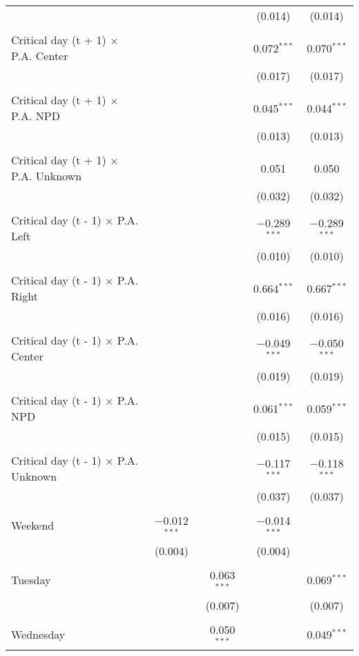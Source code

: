 \documentclass[
]{article}
\begin{document}
\begin{table}[!htbp]
{\begin{tabular}{@{\extracolsep{5pt}}lcccc}
  &  &  & (0.014) & (0.014) \\ 
  & & & & \\ 
 Critical day (t + 1) $\times$ P.A. Center &  &  & 0.072$^{***}$ & 0.070$^{***}$ \\ 
  &  &  & (0.017) & (0.017) \\ 
  & & & & \\ 
 Critical day (t + 1) $\times$ P.A. NPD &  &  & 0.045$^{***}$ & 0.044$^{***}$ \\ 
  &  &  & (0.013) & (0.013) \\ 
  & & & & \\ 
 Critical day (t + 1) $\times$ P.A. Unknown &  &  & 0.051 & 0.050 \\ 
  &  &  & (0.032) & (0.032) \\ 
  & & & & \\ 
 Critical day (t - 1) $\times$ P.A. Left &  &  & $-$0.289$^{***}$ & $-$0.289$^{***}$ \\ 
  &  &  & (0.010) & (0.010) \\ 
  & & & & \\ 
 Critical day (t - 1) $\times$ P.A. Right &  &  & 0.664$^{***}$ & 0.667$^{***}$ \\ 
  &  &  & (0.016) & (0.016) \\ 
  & & & & \\ 
 Critical day (t - 1) $\times$ P.A. Center &  &  & $-$0.049$^{***}$ & $-$0.050$^{***}$ \\ 
  &  &  & (0.019) & (0.019) \\ 
  & & & & \\ 
 Critical day (t - 1) $\times$ P.A. NPD &  &  & 0.061$^{***}$ & 0.059$^{***}$ \\ 
  &  &  & (0.015) & (0.015) \\ 
  & & & & \\ 
 Critical day (t - 1) $\times$ P.A. Unknown &  &  & $-$0.117$^{***}$ & $-$0.118$^{***}$ \\ 
  &  &  & (0.037) & (0.037) \\ 
  & & & & \\ 
 Weekend & $-$0.012$^{***}$ &  & $-$0.014$^{***}$ &  \\ 
  & (0.004) &  & (0.004) &  \\ 
  & & & & \\ 
 Tuesday &  & 0.063$^{***}$ &  & 0.069$^{***}$ \\ 
  &  & (0.007) &  & (0.007) \\ 
  & & & & \\ 
 Wednesday &  & 0.050$^{***}$ &  & 0.049$^{***}$ \\ 

\end{tabular}}
\end{table}
\end{document}
